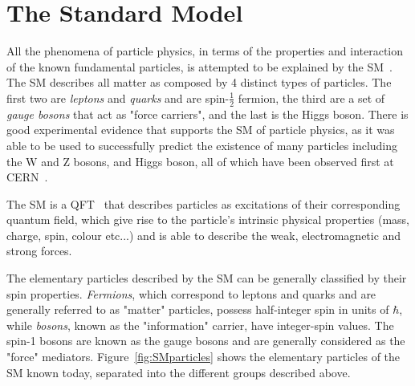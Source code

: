 


	\section{The Standard Model} \label{sec:SM}
	
	 \SMparticles
	All the phenomena of particle physics, in terms of the properties and interaction of the known fundamental particles, is attempted to be explained by the \ac{SM}~\cite{MartinB.R.BrianRobert1997Pp}.
	The \ac{SM} describes all matter as composed by 4 distinct types of particles. 
	The first two are \textit{leptons} and \textit{quarks} and are spin-$\frac{1}{2}$ fermion, the third are a set of \textit{gauge bosons} that act as "force carriers", and the last is the Higgs boson. 
	There is good experimental evidence that supports the \ac{SM} of particle physics, as it was able to be used to successfully predict the existence of many particles including the W and Z bosons,
	  and Higgs boson, all of which have been observed first at \ac{CERN}~\cite{WbosonDiscovery,ZbosonDiscovery,TauDiscovery,ATLASHiggs2012,CMSHiggs2012}.
	 
	
	 
	 The \ac{SM} is a \ac{QFT}~\cite{Peskin1995} that describes particles as excitations of their corresponding quantum field, which give rise to the particle's intrinsic physical properties (mass, charge, spin, colour etc...) and is able to describe the weak, electromagnetic and strong forces.%
	 
	 The elementary particles described by the \ac{SM} can be generally classified by their spin properties.
	 \textit{Fermions}, which correspond to leptons and quarks and are generally referred to as "matter" particles, possess half-integer spin in units of $\hbar$, while \textit{bosons}, known as the "information" carrier, have integer-spin values. 
	 The spin-1 bosons are known as the gauge bosons and are generally considered as the "force" mediators.
	 Figure~\ref{fig:SMparticles} shows the elementary particles of the \ac{SM} known today, separated into the different groups described above.
	 
